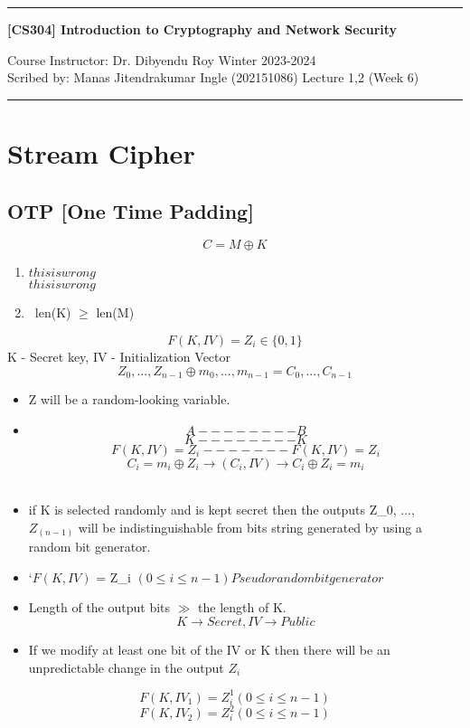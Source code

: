 \documentclass[11pt]{article}
\begin{document}
\noindent
\rule{\textwidth}{1pt}
\begin{center}
{\bf [CS304] Introduction to Cryptography and Network Security}
\end{center}
Course Instructor: Dr. Dibyendu Roy \hfill Winter 2023-2024\\
Scribed by: Manas Jitendrakumar Ingle (202151086) \hfill Lecture 1,2 (Week 6)
\\
\rule{\textwidth}{1pt}

\section*{Stream Cipher}
\subsection*{OTP [One Time Padding]}
 \[C = M \oplus K\]
 \begin{enumerate} 
    \item
      { \hspace{5cm} \rightarrow{}$this is wrong$\\
       \hspace{5cm} \rightarrow{} $this is wrong$}\\
      \hspace{10cm}
     
     \item\ len(K) $\geq$ len(M)
 \end{enumerate}

\[F(K,IV) = Z_i \in \{0,1\}\]
K - Secret key, IV - Initialization Vector
\[Z_0, ..., Z_{n-1} \oplus m_0, ..., m_{n-1} = C_0, ..., C_{n-1}\]

\begin{itemize}
    \item Z will be a random-looking variable.
    \item{
\[A -------- B\]
\[K -------- K\]
\[F(K,IV)=Z_i ------- F(K, IV)=Z_i\]
\[C_i =m_i \oplus Z_i  \rightarrow{(C_i, IV)} \rightarrow C_i \oplus Z_i = m_i\]\\}
    
    \item  if K is selected randomly and is kept secret then the outputs Z_0, ..., $Z_{(n-1)}$ will be indistinguishable from bits string generated by using a random bit generator.
    \item
    {`$F(K,IV)$ = Z_i $(0 \leq i \leq n-1)$\rightarrow $Pseudorandom bit generator$ }
    
    \item Length of the output bits $\gg$ the length of K.
    \begin{equation}
        K \rightarrow Secret, IV \rightarrow Public
    \end{equation}
    \item If we modify at least one bit of the IV or K then there will be an unpredictable change in the output $Z_i$ 
\end{itemize}
\[F(K,IV_1) = Z_i^1 (0 \leq i \leq n-1)\]
\[F(K,IV_2) = Z_i^2 (0 \leq i \leq n-1)\]
\end{document}

